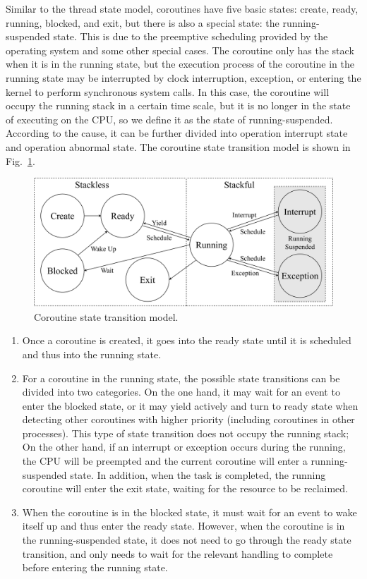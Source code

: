 \documentclass[sigconf,review,anonymous]{acmart}
\begin{document}
Similar to the thread state model, coroutines have five basic states: create, ready, running, blocked, and exit, but there is also a special state: the running-suspended state. This is due to the preemptive scheduling provided by the operating system and some other special cases. The coroutine only has the stack when it is in the running state, but the execution process of the coroutine in the running state may be interrupted by clock interruption, exception, or entering the kernel to perform synchronous system calls. In this case, the coroutine will occupy the running stack in a certain time scale, but it is no longer in the state of executing on the CPU, so we define it as the state of running-suspended. According to the cause, it can be further divided into operation interrupt state and operation abnormal state. The coroutine state transition model is shown in Fig.~\ref{fig:state}.

\begin{figure}[h]
  \centering
  \includegraphics[width=\linewidth]{assets/cstate.pdf}
  \caption{Coroutine state transition model.}
  \label{fig:state}
\end{figure}

\begin{enumerate}[leftmargin=*]
    \item Once a coroutine is created, it goes into the ready state until it is scheduled and thus into the running state.
    \item For a coroutine in the running state, the possible state transitions can be divided into two categories. On the one hand, it may wait for an event to enter the blocked state, or it may yield actively and turn to ready state when detecting other coroutines with higher priority (including coroutines in other processes). This type of state transition does not occupy the running stack; On the other hand, if an interrupt or exception occurs during the running, the CPU will be preempted and the current coroutine will enter a running-suspended state. In addition, when the task is completed, the running coroutine will enter the exit state, waiting for the resource to be reclaimed.
    \item When the coroutine is in the blocked state, it must wait for an event to wake itself up and thus enter the ready state. However, when the coroutine is in the running-suspended state, it does not need to go through the ready state transition, and only needs to wait for the relevant handling to complete before entering the running state.
\end{enumerate}
\end{document}
